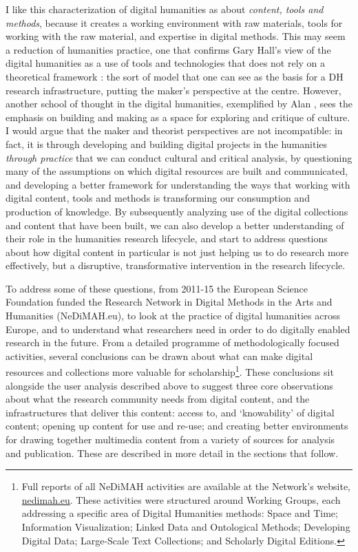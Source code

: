 \documentclass[amsthm,ebook]{saparticle}
\begin{document}
I like this characterization of digital humanities as about \emph{content, tools and methods}, because it creates a working environment with raw materials, tools for working with the raw material, and expertise in digital methods. This may seem a reduction of humanities practice, one that confirms Gary Hall’s view of the digital humanities as a use of tools and technologies that does not rely on a theoretical framework \citep{Hall:2012aa}: the sort of model that one can see as the basis for a DH research infrastructure, putting the maker’s perspective at the centre.  However, another school of thought in the digital humanities, exemplified by Alan \citet{Liu:2012aa}, sees the emphasis on building and making as a space for exploring and critique of culture. I would argue that the maker and theorist perspectives are not incompatible: in fact, it is through developing and building digital projects in the humanities \emph{through practice} that we can conduct cultural and critical analysis, by questioning many of the assumptions on which digital resources are built and communicated, and developing a better framework for understanding the ways that working with digital content, tools and methods is transforming our consumption and production of knowledge. By subsequently analyzing use of the digital collections and content that have been built, we can also develop a better understanding of their role in the humanities research lifecycle, and start to address questions about how digital content in particular is not just helping us to do research more effectively, but a disruptive, transformative intervention in the research lifecycle. 

To address some of these questions, from 2011-15 the European Science Foundation funded the Research Network in Digital Methods in the Arts and Humanities (NeDiMAH.eu), to look at the practice of digital humanities across Europe, and to understand what researchers need in order to do digitally enabled research in the future. From a detailed programme of methodologically focused activities, several conclusions can be drawn about what can make digital resources and collections more valuable for scholarship\footnote{Full reports of all NeDiMAH activities are available at the Network’s website, \url{nedimah.eu}. These activities were structured around Working Groups, each addressing a specific area of Digital Humanities methods: Space and Time; Information Visualization; Linked Data and Ontological Methods; Developing Digital Data; Large-Scale Text Collections; and Scholarly Digital Editions.}. These conclusions sit alongside the user analysis described above to suggest three core observations about what the research community needs from digital content, and the infrastructures that deliver this content: access to, and `knowability' of digital content; opening up content for use and re-use; and creating better environments for drawing together multimedia content from a variety of sources for analysis and publication. These are described in more detail in the sections that follow. 
\end{document}
